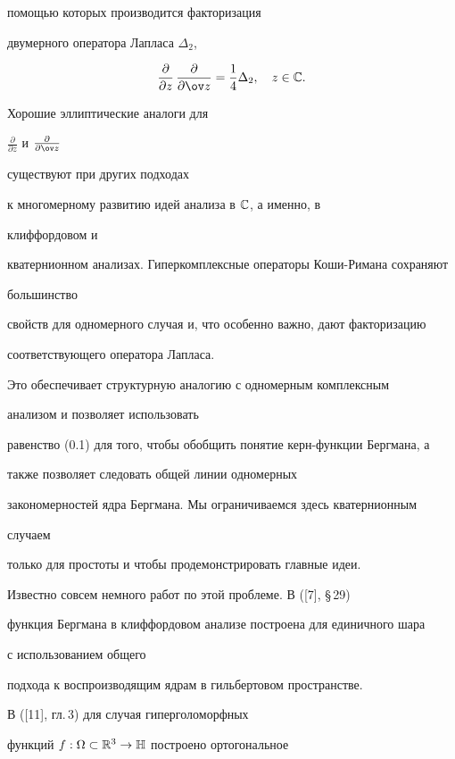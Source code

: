 помощью которых производится факторизация 


двумерного оператора Лапласа $\Delta_2$,


$$ 


\frac{\partial}{\partial z}\,


\frac{\partial}{\partial\ov z}=\frac{1}{4}\Delta_2,\quad 


z\in\Bbb C. 


$$ 


 


Хорошие эллиптические аналоги для 


$\frac{\partial}{\partial z}$ и $\frac{\partial}{\partial\ov z}$ 


существуют при других подходах 


к многомерному развитию идей анализа в $\Bbb C$, а именно, в 


клиффордовом и 


кватернионном анализах. Гиперкомплексные операторы Коши-Римана сохраняют 


большинство 


свойств для одномерного случая и, что особенно важно, дают факторизацию 


соответствующего оператора Лапласа. 


Это обеспечивает структурную аналогию с одномерным комплексным 


анализом и позволяет использовать 


равенство (0.1) для того, чтобы обобщить понятие керн-функции Бергмана, а 


также позволяет следовать общей линии одномерных 


закономерностей ядра Бергмана. Мы ограничиваемся здесь кватернионным 


случаем 


только для простоты и чтобы продемонстрировать главные идеи. 


 


Известно совсем немного работ по этой проблеме. В ([7], \S\,29) 


функция Бергмана в клиффордовом анализе построена для единичного шара 


с использованием общего 


подхода к воспроизводящим ядрам в гильбертовом пространстве. 


В ([11], гл.\,3) для случая гиперголоморфных 


функций $f:\Omega\subset\Bbb R^3\to\Bbb H$ построено ортогональное 


